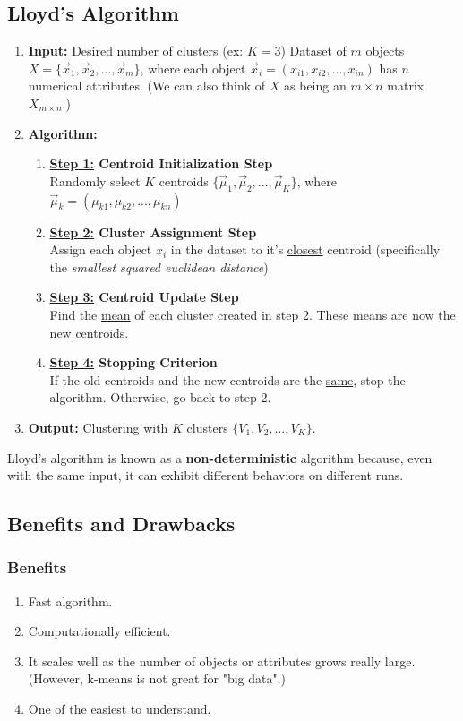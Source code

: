 \documentclass[11pt]{elegantbook}
\begin{document}
\subsection{Lloyd's Algorithm}
\begin{enumerate}
    \item \textbf{Input:}
    \subitem Desired number of clusters (ex: $K=3$)
    \subitem Dataset of $m$ objects $X=\{\vec{x}_1,\vec{x}_2,...,\vec{x}_m\}$, where each object $\vec{x}_i=(x_{i1},x_{i2},...,x_{in})$ has $n$ numerical attributes. (We can also think of $X$ as being an $m\times n$ matrix $X_{m\times n}$.)
    \item \textbf{Algorithm:}
    \begin{enumerate}[$\bullet$]
        \item \textbf{\underline{Step 1:} Centroid Initialization Step}\\
        Randomly select $K$ centroids $\{\vec{\mu}_1,\vec{\mu}_2,...,\vec{\mu}_K\}$, where $\vec{\mu}_k=(\mu_{k1},\mu_{k2},...,\mu_{kn})$
        \item \textbf{\underline{Step 2:} Cluster Assignment Step}\\
        Assign each object $x_i$ in the dataset to it's \underline{closest} centroid (specifically the \textit{smallest squared euclidean distance})
        \item \textbf{\underline{Step 3:} Centroid Update Step}\\
        Find the \underline{mean} of each cluster created in step 2. These means are now the new \underline{centroids}.
        \item \textbf{\underline{Step 4:} Stopping Criterion}\\
        If the old centroids and the new centroids are the \underline{same}, stop the algorithm. Otherwise, go back to step 2.
    \end{enumerate}
    \item \textbf{Output:} Clustering with $K$ clusters $\{V_1,V_2,...,V_K\}$.
\end{enumerate}
Lloyd's algorithm is known as a \textbf{non-deterministic} algorithm because,
even with the same input, it can exhibit different behaviors on different runs.

\subsection{Benefits and Drawbacks}
\subsubsection*{Benefits}
\begin{enumerate}[$\bullet$]
    \item Fast algorithm.
    \item Computationally efficient.
    \item It scales well as the number of objects or attributes grows really large. (However, k-means is not great for "big data".)
    \item One of the easiest to understand.
\end{enumerate}
\end{document}
